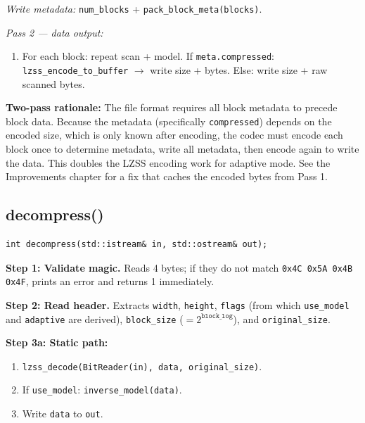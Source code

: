 \emph{Write metadata:} \texttt{num\_blocks} + \texttt{pack\_block\_meta(blocks)}.

\emph{Pass 2 --- data output:}
\begin{enumerate}
  \item For each block: repeat scan + model. If \texttt{meta.compressed}:
        \texttt{lzss\_encode\_to\_buffer} $\to$ write size + bytes.
        Else: write size + raw scanned bytes.
\end{enumerate}

\textbf{Two-pass rationale:}
The file format requires all block metadata to precede block data.
Because the metadata (specifically \texttt{compressed}) depends on the encoded size,
which is only known after encoding, the codec must encode each block once to determine
metadata, write all metadata, then encode again to write the data.
This doubles the LZSS encoding work for adaptive mode.
See the Improvements chapter for a fix that caches the encoded bytes from Pass 1.

\subsection{decompress()}

\begin{lstlisting}[style=cpp]
int decompress(std::istream& in, std::ostream& out);
\end{lstlisting}

\textbf{Step 1: Validate magic.}
Reads 4 bytes; if they do not match \texttt{0x4C 0x5A 0x4B 0x4F}, prints an error and
returns 1 immediately.

\textbf{Step 2: Read header.}
Extracts \texttt{width}, \texttt{height}, \texttt{flags} (from which \texttt{use\_model}
and \texttt{adaptive} are derived), \texttt{block\_size} ($= 2^{\mathtt{block\_log}}$),
and \texttt{original\_size}.

\textbf{Step 3a: Static path:}
\begin{enumerate}
  \item \texttt{lzss\_decode(BitReader(in), data, original\_size)}.
  \item If \texttt{use\_model}: \texttt{inverse\_model(data)}.
  \item Write \texttt{data} to \texttt{out}.
\end{enumerate}

